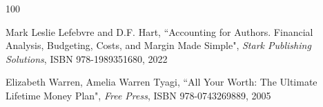 \begin{thebibliography}{100}


  Mark Leslie Lefebvre and D.F. Hart, ``Accounting for Authors.
Financial Analysis, Budgeting, Costs, and Margin Made Simple", \emph{Stark Publishing
Solutions}, ISBN 978-1989351680, 2022

 Elizabeth Warren, Amelia Warren Tyagi, ``All Your Worth: The
Ultimate Lifetime Money Plan", \emph{Free Press},  ISBN 978-0743269889, 2005


\end{thebibliography}

